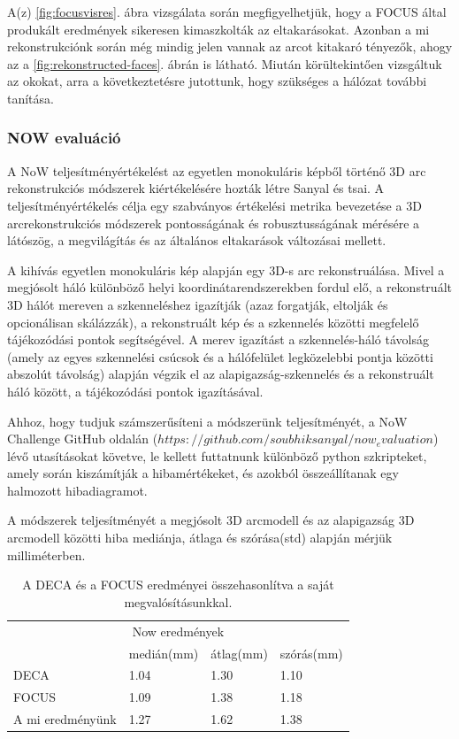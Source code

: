 \documentclass[12pt,a4]{article}
\begin{document}
            A(z) \ref{fig:focusvisres}. ábra vizsgálata során megfigyelhetjük, hogy a FOCUS által produkált eredmények sikeresen kimaszkolták az eltakarásokat. Azonban a mi rekonstrukciónk során még mindig jelen vannak az arcot kitakaró tényezők, ahogy az a \ref{fig:rekonstructed-faces}. ábrán is látható. Miután körültekintően vizsgáltuk az okokat, arra a következtetésre jutottunk, hogy szükséges a hálózat további tanítása.
            
            \clearpage
            \subsubsection{NOW evaluáció}

            A NoW teljesítményértékelést az egyetlen monokuláris képből történő 3D arc rekonstrukciós módszerek kiértékelésére hozták létre Sanyal és tsai. \cite{now} A teljesítményértékelés célja egy szabványos értékelési metrika bevezetése a 3D arcrekonstrukciós módszerek pontosságának és robusztusságának mérésére a látószög, a megvilágítás és az általános eltakarások változásai mellett.

            A kihívás egyetlen monokuláris kép alapján egy 3D-s arc rekonstruálása. Mivel a megjósolt háló különböző helyi koordinátarendszerekben fordul elő, a rekonstruált 3D hálót mereven a szkenneléshez igazítják (azaz forgatják, eltolják és opcionálisan skálázzák), a rekonstruált kép és a szkennelés közötti megfelelő tájékozódási pontok segítségével. A merev igazítást a szkennelés-háló távolság (amely az egyes szkennelési csúcsok és a hálófelület legközelebbi pontja közötti abszolút távolság) alapján végzik el az alapigazság-szkennelés és a rekonstruált háló között, a tájékozódási pontok igazításával.

            Ahhoz, hogy tudjuk számszerűsíteni a módszerünk teljesítményét, a NoW Challenge GitHub oldalán ($https://github.com/soubhiksanyal/now_evaluation$) lévő utasításokat követve, le kellett futtatnunk különböző python szkripteket, amely során kiszámítják a hibamértékeket, és azokból összeállítanak egy halmozott hibadiagramot.
            
            A módszerek teljesítményét a megjósolt 3D arcmodell és az alapigazság 3D arcmodell közötti hiba mediánja, átlaga és szórása(std) alapján mérjük milliméterben. 
            
            \begin{table}[htb]\centering
            \begin{tabular}{llll}
            \multicolumn{4}{c}{Now eredmények}                 \\
                             & medián(mm) & átlag(mm) & szórás(mm) \\
            DECA             & 1.04       & 1.30     & 1.10    \\
            FOCUS            & 1.09       & 1.38     & 1.18    \\
            A mi eredményünk & 1.27       & 1.62     & 1.38   
            \end{tabular}
            \caption{A DECA és a FOCUS eredményei összehasonlítva a saját megvalósításunkkal.}
            \end{table}
\end{document}
